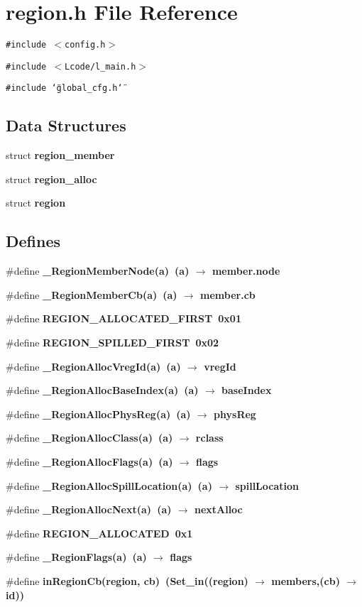 \section{region.h File Reference}
\label{region_8h}
{\tt \#include $<$config.h$>$}\par
{\tt \#include $<$Lcode/l\_\-main.h$>$}\par
{\tt \#include \char`\"{}global\_\-cfg.h\char`\"{}}\par
\subsection*{Data Structures}
\begin{CompactItemize}
\item 
struct \bf{region\_\-member}
\item 
struct \bf{region\_\-alloc}
\item 
struct \bf{region}
\end{CompactItemize}
\subsection*{Defines}
\begin{CompactItemize}
\item 
\#define \bf{\_\-Region\-Member\-Node}(a)~(a) $\rightarrow$ \bf{member.node}
\item 
\#define \bf{\_\-Region\-Member\-Cb}(a)~(a) $\rightarrow$ member.cb
\item 
\#define \bf{REGION\_\-ALLOCATED\_\-FIRST}~0x01
\item 
\#define \bf{REGION\_\-SPILLED\_\-FIRST}~0x02
\item 
\#define \bf{\_\-Region\-Alloc\-Vreg\-Id}(a)~(a) $\rightarrow$ vreg\-Id
\item 
\#define \bf{\_\-Region\-Alloc\-Base\-Index}(a)~(a) $\rightarrow$ base\-Index
\item 
\#define \bf{\_\-Region\-Alloc\-Phys\-Reg}(a)~(a) $\rightarrow$ phys\-Reg
\item 
\#define \bf{\_\-Region\-Alloc\-Class}(a)~(a) $\rightarrow$ rclass
\item 
\#define \bf{\_\-Region\-Alloc\-Flags}(a)~(a) $\rightarrow$ flags
\item 
\#define \bf{\_\-Region\-Alloc\-Spill\-Location}(a)~(a) $\rightarrow$ spill\-Location
\item 
\#define \bf{\_\-Region\-Alloc\-Next}(a)~(a) $\rightarrow$ next\-Alloc
\item 
\#define \bf{REGION\_\-ALLOCATED}~0x1
\item 
\#define \bf{\_\-Region\-Flags}(a)~(a) $\rightarrow$ flags
\item 
\#define \bf{in\-Region\-Cb}(\bf{region}, cb)~(\bf{Set\_\-in}((\bf{region}) $\rightarrow$ members,(cb) $\rightarrow$ id))
\end{CompactItemize}
